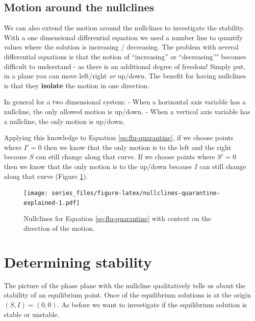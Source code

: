 \documentclass[
]{book}
\theoremstyle{definition}
\theoremstyle{definition}
\theoremstyle{definition}
\theoremstyle{remark}
\begin{document}
\hypertarget{motion-around-the-nullclines}{%
\subsection{Motion around the nullclines}\label{motion-around-the-nullclines}}

We can also extend the motion around the nullclines to investigate the stability. With a one dimensional differential equation we used a number line to quantify values where the solution is increasing / decreasing. The problem with several differential equations is that the notion of ``increasing'' or ``decreasing''" becomes difficult to understand - as there is an additional degree of freedom! Simply put, in a plane you can move left/right \emph{or} up/down. The benefit for having nullclines is that they \textbf{isolate} the motion in one direction.

In general for a two dimensional system:
- When a horizontal axis variable has a nullcline, the only allowed motion is up/down.
- When a vertical axis variable has a nullcline, the only motion is up/down.

Applying this knowledge to Equation \eqref{eq:flu-quarantine}, if we choose points where \(I'=0\) then we know that the only motion is to the left and the right because \(S\) can still change along that curve. If we choose points where \(S'=0\) then we know that the only motion is to the up/down because \(I\) can still change along that curve (Figure \ref{fig:nullclines-quarantine-explained}).

\begin{figure}
\centering
\texttt{[image: series\_files/figure-latex/nullclines-quarantine-explained-1.pdf]}
\caption{\label{fig:nullclines-quarantine-explained}Nullclines for Equation \eqref{eq:flu-quarantine} with context on the direction of the motion.}
\end{figure}

\hypertarget{determining-stability}{%
\section{Determining stability}\label{determining-stability}}

The picture of the phase plane with the nullcline qualitatively tells us about the stability of an equilibrium point. Once of the equilibrium solutions is at the origin \((S,I)=(0,0)\). As before we want to investigate if the equilibrium solution is stable or unstable.
\end{document}

